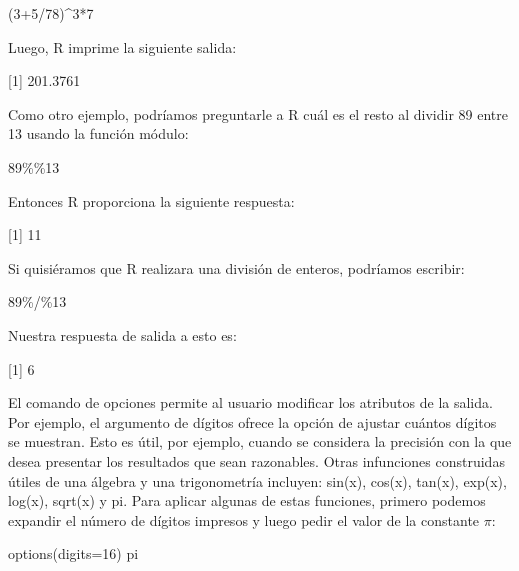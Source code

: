 \documentclass[
]{book}
\newenvironment{Shaded}{\begin{snugshade}}{\end{snugshade}}
\newcommand{\AttributeTok}[1]{\textcolor[rgb]{0.77,0.63,0.00}{#1}}
\newcommand{\DecValTok}[1]{\textcolor[rgb]{0.00,0.00,0.81}{#1}}
\newcommand{\FunctionTok}[1]{\textcolor[rgb]{0.00,0.00,0.00}{#1}}
\newcommand{\NormalTok}[1]{#1}
\newcommand{\SpecialCharTok}[1]{\textcolor[rgb]{0.00,0.00,0.00}{#1}}
\begin{document}
\begin{Shaded}
\begin{Highlighting}[]
\NormalTok{(}\DecValTok{3}\SpecialCharTok{+}\DecValTok{5}\SpecialCharTok{/}\DecValTok{78}\NormalTok{)}\SpecialCharTok{\^{}}\DecValTok{3}\SpecialCharTok{*}\DecValTok{7}
\end{Highlighting}
\end{Shaded}

Luego, R imprime la siguiente salida:

{[}1{]} 201.3761

Como otro ejemplo, podríamos preguntarle a R cuál es el resto al dividir 89 entre 13 usando la función módulo:

\begin{Shaded}
\begin{Highlighting}[]
\DecValTok{89}\SpecialCharTok{\%\%}\DecValTok{13}
\end{Highlighting}
\end{Shaded}

Entonces R proporciona la siguiente respuesta:

{[}1{]} 11

Si quisiéramos que R realizara una división de enteros, podríamos escribir:

\begin{Shaded}
\begin{Highlighting}[]
\DecValTok{89}\SpecialCharTok{\%/\%}\DecValTok{13}
\end{Highlighting}
\end{Shaded}

Nuestra respuesta de salida a esto es:

{[}1{]} 6

El comando de opciones permite al usuario modificar los atributos de la salida. Por ejemplo, el argumento de dígitos ofrece la opción de ajustar cuántos dígitos se muestran. Esto es útil, por ejemplo, cuando se considera la precisión con la que desea presentar los resultados que sean razonables. Otras infunciones construidas útiles de una álgebra y una trigonometría incluyen: sin(x), cos(x), tan(x), exp(x), log(x), sqrt(x) y pi. Para aplicar algunas de estas funciones, primero podemos expandir el número de dígitos impresos y luego pedir el valor de la constante \(\pi\):

\begin{Shaded}
\begin{Highlighting}[]
\FunctionTok{options}\NormalTok{(}\AttributeTok{digits=}\DecValTok{16}\NormalTok{)}
\NormalTok{pi}
\end{Highlighting}
\end{Shaded}
\end{document}
